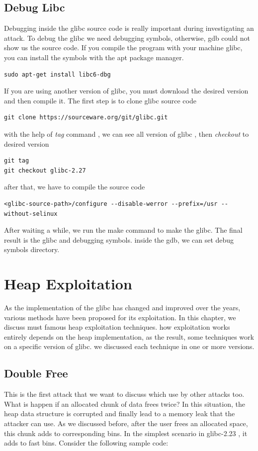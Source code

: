 \documentclass{masterthesis}
\newcommand*\libc{glibc}
\newcommand*\fb{fast bins}
\begin{document}
\section{Debug Libc}

Debugging inside the \libc{} source code is really important during investigating an attack. To debug the \libc{} we need debugging symbols, otherwise, gdb could not show us the source code. If you compile the program with your machine \libc{}, you can install the symbols with the apt package manager.
\begin{lstlisting}[frame=tlrb]
sudo apt-get install libc6-dbg
\end{lstlisting}

If you are using another version of \libc{}, you must download the desired version and then compile it. The first step is to clone \libc{} source code
\begin{lstlisting}[frame=tlrb]
git clone https://sourceware.org/git/glibc.git
\end{lstlisting}
with the help of \emph{tag} command , we can see all version of \libc{} , then \emph{checkout} to desired version
\begin{lstlisting}[frame=tlrb]
git tag
git checkout glibc-2.27
\end{lstlisting}
after that, we have to compile the source code 
\begin{lstlisting}[frame=tlrb]
<glibc-source-path>/configure --disable-werror --prefix=/usr --without-selinux
\end{lstlisting}
After waiting a while, we run the make command to make the \libc{}. The final result is the \libc{} and debugging symbols. inside the gdb, we can set debug symbols directory.

\chapter{Heap Exploitation }

As the implementation of the \libc{} has changed and improved over the years, various methods have been proposed for its exploitation. In this chapter, we discuss must famous heap exploitation techniques. how exploitation works entirely depends on the heap implementation, as the result, some techniques work on a specific version of \libc{}. we discussed each technique in one or more versions.

\section{Double Free}
This is the first attack that we want to discuss which use by other attacks too. What is happen if an allocated chunk of data frees twice? In this situation, the heap data structure is corrupted and finally lead to a memory leak that the attacker can use. As we discussed before, after the user frees an allocated space, this chunk adds to corresponding bins. In the simplest scenario in \libc{-2.23} , it adds to \fb{}. Consider the following sample code:
\end{document}
